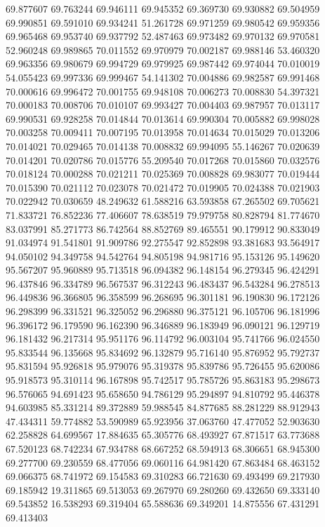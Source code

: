69.877607
69.763244
69.946111
69.945352
69.369730
69.930882
69.504959
69.990851
69.591010
69.934241
51.261728
69.971259
69.980542
69.959356
69.965468
69.953740
69.937792
52.487463
69.973482
69.970132
69.970581
52.960248
69.989865
70.011552
69.970979
70.002187
69.988146
53.460320
69.963356
69.980679
69.994729
69.979925
69.987442
69.974044
70.010019
54.055423
69.997336
69.999467
54.141302
70.004886
69.982587
69.991468
70.000616
69.996472
70.001755
69.948108
70.006273
70.008830
54.397321
70.000183
70.008706
70.010107
69.993427
70.004403
69.987957
70.013117
69.990531
69.928258
70.014844
70.013614
69.990304
70.005882
69.998028
70.003258
70.009411
70.007195
70.013958
70.014634
70.015029
70.013206
70.014021
70.029465
70.014138
70.008832
69.994095
55.146267
70.020639
70.014201
70.020786
70.015776
55.209540
70.017268
70.015860
70.032576
70.018124
70.000288
70.021211
70.025369
70.008828
69.983077
70.019444
70.015390
70.021112
70.023078
70.021472
70.019905
70.024388
70.021903
70.022942
70.030659
48.249632
61.588216
63.593858
67.265502
69.705621
71.833721
76.852236
77.406607
78.638519
79.979758
80.828794
81.774670
83.037991
85.271773
86.742564
88.852769
89.465551
90.179912
90.833049
91.034974
91.541801
91.909786
92.275547
92.852898
93.381683
93.564917
94.050102
94.349758
94.542764
94.805198
94.981716
95.153126
95.149620
95.567207
95.960889
95.713518
96.094382
96.148154
96.279345
96.424291
96.437846
96.334789
96.567537
96.312243
96.483437
96.543284
96.278513
96.449836
96.366805
96.358599
96.268695
96.301181
96.190830
96.172126
96.298399
96.331521
96.325052
96.296880
96.375121
96.105706
96.181996
96.396172
96.179590
96.162390
96.346889
96.183949
96.090121
96.129719
96.181432
96.217314
95.951176
96.114792
96.003104
95.741766
96.024550
95.833544
96.135668
95.834692
96.132879
95.716140
95.876952
95.792737
95.831594
95.926818
95.979076
95.319378
95.839786
95.726455
95.620086
95.918573
95.310114
96.167898
95.742517
95.785726
95.863183
95.298673
96.576065
94.691423
95.658650
94.786129
95.294897
94.810792
95.446378
94.603985
85.331214
89.372889
59.988545
84.877685
88.281229
88.912943
47.434311
59.774882
53.590989
65.923956
37.063760
47.477052
52.903630
62.258828
64.699567
17.884635
65.305776
68.493927
67.871517
63.773688
67.520123
68.742234
67.934788
68.667252
68.594913
68.306651
68.945300
69.277700
69.230559
68.477056
69.060116
64.981420
67.863484
68.463152
69.066375
68.741972
69.154583
69.310283
66.721630
69.493499
69.217930
69.185942
19.311865
69.513053
69.267970
69.280260
69.432650
69.333140
69.543852
16.538293
69.319404
65.588636
69.349201
14.875556
67.431291
69.413403
